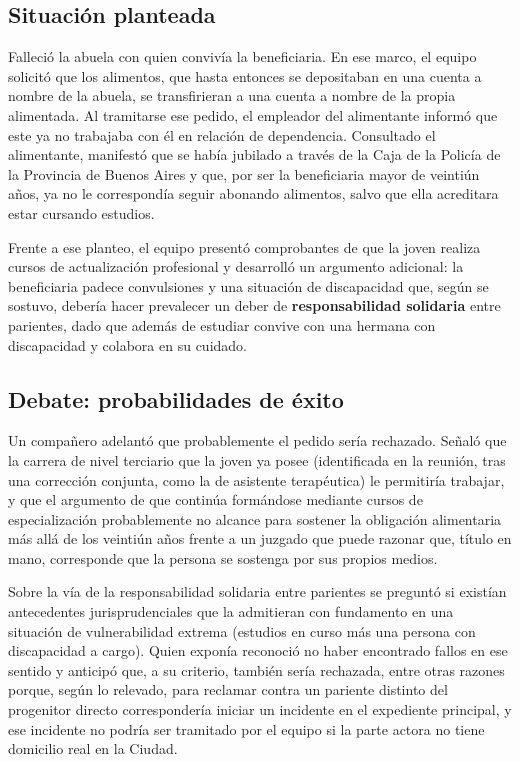 \documentclass[12pt,oneside]{book}
\begin{document}
\subsection{Situación planteada}

Falleció la abuela con quien convivía la beneficiaria. En ese marco, el equipo solicitó que los alimentos, que hasta entonces se depositaban en una cuenta a nombre de la abuela, se transfirieran a una cuenta a nombre de la propia alimentada. Al tramitarse ese pedido, el empleador del alimentante informó que este ya no trabajaba con él en relación de dependencia. Consultado el alimentante, manifestó que se había jubilado a través de la Caja de la Policía de la Provincia de Buenos Aires y que, por ser la beneficiaria mayor de veintiún años, ya no le correspondía seguir abonando alimentos, salvo que ella acreditara estar cursando estudios.

Frente a ese planteo, el equipo presentó comprobantes de que la joven realiza cursos de actualización profesional y desarrolló un argumento adicional: la beneficiaria padece convulsiones y una situación de discapacidad que, según se sostuvo, debería hacer prevalecer un deber de \textbf{responsabilidad solidaria} entre parientes, dado que además de estudiar convive con una hermana con discapacidad y colabora en su cuidado.

\subsection{Debate: probabilidades de éxito}

Un compañero adelantó que probablemente el pedido sería rechazado. Señaló que la carrera de nivel terciario que la joven ya posee (identificada en la reunión, tras una corrección conjunta, como la de asistente terapéutica) le permitiría trabajar, y que el argumento de que continúa formándose mediante cursos de especialización probablemente no alcance para sostener la obligación alimentaria más allá de los veintiún años frente a un juzgado que puede razonar que, título en mano, corresponde que la persona se sostenga por sus propios medios.

Sobre la vía de la responsabilidad solidaria entre parientes se preguntó si existían antecedentes jurisprudenciales que la admitieran con fundamento en una situación de vulnerabilidad extrema (estudios en curso más una persona con discapacidad a cargo). Quien exponía reconoció no haber encontrado fallos en ese sentido y anticipó que, a su criterio, también sería rechazada, entre otras razones porque, según lo relevado, para reclamar contra un pariente distinto del progenitor directo correspondería iniciar un incidente en el expediente principal, y ese incidente no podría ser tramitado por el equipo si la parte actora no tiene domicilio real en la Ciudad.
\end{document}
